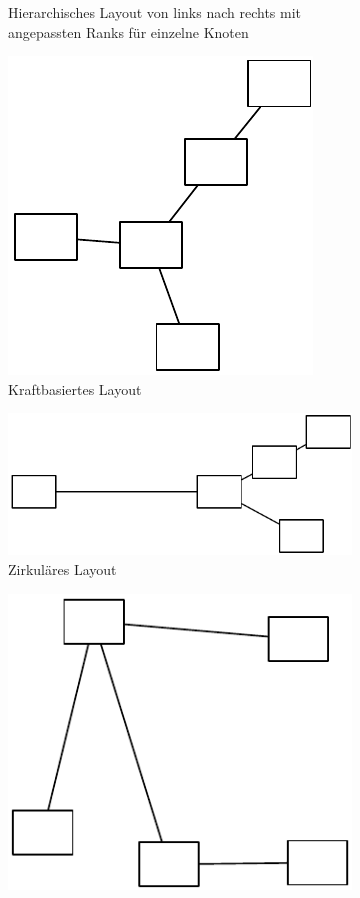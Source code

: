 \begin{figure}[hbt]
\begin{subfigure}{\subfigureshortwidth}
        \caption{Hierarchisches Layout von links nach rechts mit angepassten Ranks für einzelne Knoten}
        \label{fig:omnigraffle-automatic-layout-c}
    \end{subfigure}
    \begin{subfigure}{\subfigureshortwidth}
        \centering
        \includegraphics[scale=\graphicsscale]{resources/omnigraffle-automatic-layout-d}
        \caption{Kraftbasiertes Layout}
        \label{fig:omnigraffle-automatic-layout-d}
    \end{subfigure}
    \begin{subfigure}{\subfigurelongwidth}
        \centering
        \includegraphics[scale=\graphicsscale]{resources/omnigraffle-automatic-layout-e}
        \caption{Zirkuläres Layout}
        \label{fig:omnigraffle-automatic-layout-e}
    \end{subfigure}
    \begin{subfigure}{\subfigureshortwidth}
        \centering
        \includegraphics[scale=\graphicsscale]{resources/omnigraffle-automatic-layout-f}

\end{subfigure}
\end{figure}
